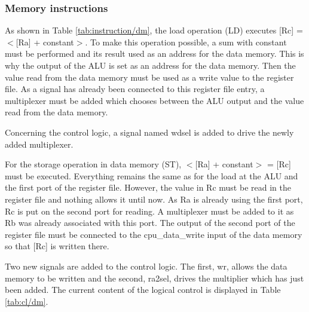 \subsubsection*{Memory instructions}

As shown in Table \ref{tab:instruction/dm}, the load operation (LD) executes [Rc] = $<$[Ra] + constant$>$.
To make this operation possible, a sum with constant must be performed and its result used as an 
address for the data memory. This is why the output of the ALU is set as an address for the data 
memory. Then the value read from the data memory must be used as a write value to the register file. 
As a signal has already been connected to this register file entry, a multiplexer must be added 
which chooses between the ALU output and the value read from the data memory.

Concerning the control logic, a signal named wdsel is added to drive the newly added multiplexer.

For the storage operation in data memory (ST), $<$[Ra] + constant$>$ = [Rc] must be executed.
Everything remains the same as for the load at the ALU and the first port of the register file. 
However, the value in Rc must be read in the register file and nothing allows it until now. As Ra is 
already using the first port, Rc is put on the second port for reading. A multiplexer must be added 
to it as Rb was already associated with this port. The output of the second port of the register 
file must be connected to the cpu\_data\_write input of the data memory so that [Rc] is written 
there. 

Two new signals are added to the control logic. The first, wr, allows the data memory to be written 
and the second, ra2sel, drives the multiplier which has just been added. The current content of the 
logical control is displayed in Table \ref{tab:cl/dm}.

